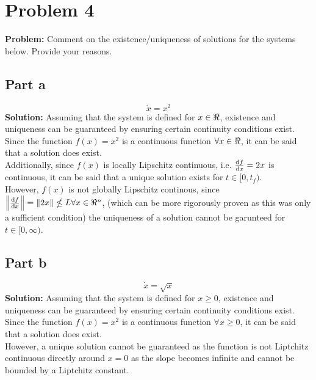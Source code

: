 \documentclass[letter]{article}
\numberwithin{equation}{section}
\begin{document}
\newpage
\section{Problem 4}
\textbf{Problem:}
Comment on the existence/uniqueness of solutions for the systems below. Provide
your reasons.\\

\subsection{Part a}
\begin{equation}
	\dot{x} = x^2
\end{equation}
\noindent
\textbf{Solution:}
Assuming that the system is defined for $x\in \real$, existence and uniqueness can be guaranteed by ensuring certain continuity conditions exist.\\
Since the function $f(x) = x^2$ is a continuous function $\forall x \in \real$, it can be said that a solution does exist.\\
Additionally, since $f(x)$ is locally Lipschitz continuous, i.e. $\dv{f}{x} = 2 x$ is continuous, it can be said that a unique solution exists for $t \in [0,t_f)$.\\
However, $f(x)$ is not globally Lipschitz continous, since $\norm{\dv{f}{x}} = \norm{2x} \nleq L \forall x \in \real^n$, (which can be more rigorously proven as this was only a sufficient condition) the uniqueness of a solution cannot be garunteed for $t \in [0,\infty)$.

\subsection{Part b}
\begin{equation}
	\dot{x} = \sqrt{x}
\end{equation}
\noindent
\textbf{Solution:}
Assuming that the system is defined for $x \geq 0$, existence and uniqueness can be guaranteed by ensuring certain continuity conditions exist.\\
Since the function $f(x) = x^2$ is a continuous function $\forall x \geq 0$, it can be said that a solution does exist.\\
However, a unique solution cannot be guaranteed as the function is not Liptchitz continuous directly around $x=0$ as the slope becomes infinite and cannot be bounded by a Liptchitz constant.
\end{document}
